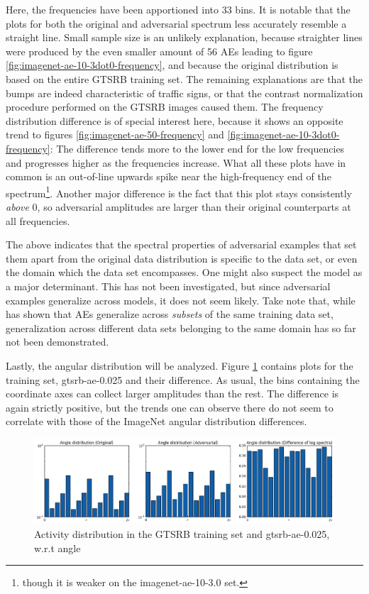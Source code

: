 \documentclass[11pt, a4paper]{article}
\begin{document}
Here, the frequencies have been apportioned into 33 bins. It is notable that the plots for both the original and adversarial spectrum less accurately resemble a straight line. Small sample size is an unlikely explanation, because straighter lines were produced by the even smaller amount of 56 AEs leading to figure \ref{fig:imagenet-ae-10-3dot0-frequency}, and because the original distribution is based on the entire GTSRB training set. The remaining explanations are that the bumps are indeed characteristic of traffic signs, or that the contrast normalization procedure performed on the GTSRB images caused them. The frequency distribution difference is of special interest here, because it shows an opposite trend to figures \ref{fig:imagenet-ae-50-frequency} and \ref{fig:imagenet-ae-10-3dot0-frequency}: The difference tends more to the lower end for the low frequencies and progresses higher as the frequencies increase. What all these plots have in common is an out-of-line upwards spike near the high-frequency end of the spectrum\footnote{though it is weaker on the imagenet-ae-10-3.0 set.}. Another major difference is the fact that this plot stays consistently \emph{above} 0, so adversarial amplitudes are larger than their original counterparts at all frequencies.

The above indicates that the spectral properties of adversarial examples that set them apart from the original data distribution is specific to the data set, or even the domain which the data set encompasses. One might also suspect the model as a major determinant. This has not been investigated, but since adversarial examples generalize across models, it does not seem likely. Take note that, while \cite{intriguing-properties-of-neural-networks} has shown that AEs generalize across \emph{subsets} of the same training data set, generalization across different data sets belonging to the same domain has so far not been demonstrated.

Lastly, the angular distribution will be analyzed. Figure \ref{fig:gtsrb-ae-0.025-angle} contains plots for the training set, gtsrb-ae-0.025 and their difference. As usual, the bins containing the coordinate axes can collect larger amplitudes than the rest. The difference is again strictly positive, but the trends one can observe there do not seem to correlate with those of the ImageNet angular distribution differences.

\begin{figure}[h!tb]
	\centering
	\includegraphics[width=\textwidth]{images/spectra/gtsrb-ae-0dot025-minconfidence-0dot5-maxorig-0-angle-16-bins.png}
	\caption[Log spectra of GTSRB and adversarial examples, angular analysis]{Activity distribution in the GTSRB training set and gtsrb-ae-0.025, w.r.t angle}
	\label{fig:gtsrb-ae-0.025-angle}
\end{figure}
\end{document}
